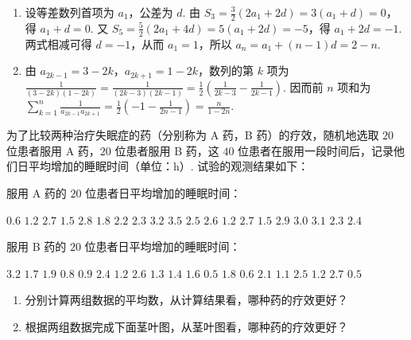 \begin{solution}
\begin{enumerate}
\item 设等差数列首项为 \(a_1\)，公差为 \(d\). 由
\(S_3=\frac{3}{2}\left(2a_1+2d\right)=3(a_1+d)=0\)，得 \(a_1+d=0\). 又
\(S_5=\frac{5}{2}\left(2a_1+4d\right)=5(a_1+2d)=-5\)，得 \(a_1+2d=-1\). 两式相减可得 \(d=-1\)，从而 \(a_1=1\)，所以 \(a_n=a_1+(n-1)d=2-n\).
\item 由 \(a_{2k-1}=3-2k\)，\(a_{2k+1}=1-2k\)，数列的第 \(k\) 项为
\(\displaystyle\frac{1}{(3-2k)(1-2k)}=\frac{1}{(2k-3)(2k-1)}=\frac{1}{2}\left(\frac{1}{2k-3}-\frac{1}{2k-1}\right)\). 因而前 \(n\) 项和为
\(\displaystyle\sum_{k=1}^{n}\frac{1}{a_{2k-1}a_{2k+1}}=\frac{1}{2}\left(-1-\frac{1}{2n-1}\right)=\frac{n}{1-2n}\).
\end{enumerate}
\end{solution}

\begin{problem}
为了比较两种治疗失眠症的药（分别称为 A 药，B 药）的疗效，随机地选取 \(20\) 位患者服用 A 药，\(20\) 位患者服用 B 药，这 \(40\) 位患者在服用一段时间后，记录他们日平均增加的睡眠时间（单位：\(\mathrm{h}\)）. 试验的观测结果如下：

服用 A 药的 \(20\) 位患者日平均增加的睡眠时间：

\(0.6\) \(1.2\) \(2.7\) \(1.5\) \(2.8\) \(1.8\) \(2.2\) \(2.3\) \(3.2\) \(3.5\)
\(2.5\) \(2.6\) \(1.2\) \(2.7\) \(1.5\) \(2.9\) \(3.0\) \(3.1\) \(2.3\) \(2.4\)

服用 B 药的 \(20\) 位患者日平均增加的睡眠时间：

\(3.2\) \(1.7\) \(1.9\) \(0.8\) \(0.9\) \(2.4\) \(1.2\) \(2.6\) \(1.3\) \(1.4\)
\(1.6\) \(0.5\) \(1.8\) \(0.6\) \(2.1\) \(1.1\) \(2.5\) \(1.2\) \(2.7\) \(0.5\)

\begin{enumerate}
\item 分别计算两组数据的平均数，从计算结果看，哪种药的疗效更好？
\item 根据两组数据完成下面茎叶图，从茎叶图看，哪种药的疗效更好？
\end{enumerate}


\end{problem}

